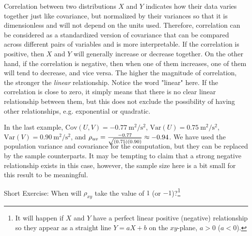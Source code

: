 Correlation between two distributions $X$ and $Y$ indicates how their data varies together just like covariance, but normalized by their variances so that it is dimensionless and will not depend on the units used. Therefore, correlation can be considered as a standardized version of covariance that can be compared across different pairs of variables and is more interpretable. If the correlation is positive, then $X$ and $Y$ will generally increase or decrease together. On the other hand, if the correlation is negative, then when one of them increases, one of them will tend to decrease, and vice versa. The higher the magnitude of correlation, the stronger the \textit{linear} relationship. Notice the word "linear" here. If the correlation is close to zero, it simply means that there is no clear linear relationship between them, but this does not exclude the possibility of having other relationships, e.g. exponential or quadratic.\par
In the last example, $\text{Cov}(U,V) = \SI{-0.77}{\square\m \per \square\s}$, $\text{Var}(U) = \SI{0.75}{\square\m \per \square\s}$, $\text{Var}(V) = \SI{0.90}{\square\m \per \square\s}$, and $\rho_{uv} = \smash{\frac{-0.77}{\sqrt{(0.75)(0.90)}}} \approx -0.94$. We have used the population variance and covariance for the computation, but they can be replaced by the sample counterparts. It may be tempting to claim that a strong negative relationship exists in this case, however, the sample size here is a bit small for this result to be meaningful. \par
Short Exercise: When will $\rho_{xy}$ take the value of $1$ (or $-1$)?\footnote{It will happen if $X$ and $Y$ have a perfect linear positive (negative) relationship so they appear as a straight line $Y = aX + b$ on the $xy$-plane, $a > 0$ ($a < 0$).}\par

